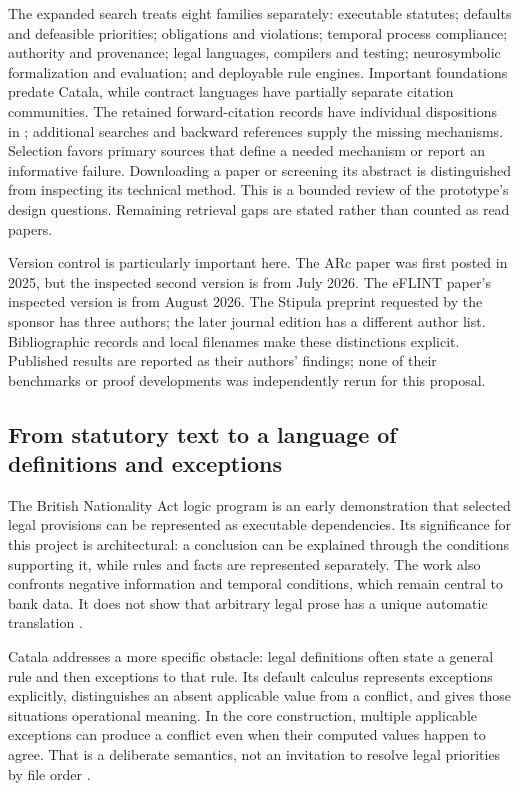 The expanded search treats eight families separately: executable statutes;
defaults and defeasible priorities; obligations and violations; temporal process
compliance; authority and provenance; legal languages, compilers and testing;
neurosymbolic formalization and evaluation; and deployable rule engines. Important
foundations predate Catala, while contract languages have partially separate
citation communities. The retained forward-citation records have individual
dispositions in ; additional searches and backward
references supply the missing mechanisms. Selection favors primary sources that
define a needed mechanism or report an informative failure. Downloading a paper
or screening its abstract is distinguished from inspecting its technical method.
This is a bounded review of the prototype's design questions. Remaining retrieval
gaps are stated rather than counted as read papers.

Version control is particularly important here. The ARc paper was first posted
in 2025, but the inspected second version is from July 2026. The eFLINT paper's
inspected version is from August 2026. The Stipula preprint requested by the
sponsor has three authors; the later journal edition has a different author list.
Bibliographic records and local filenames make these distinctions explicit.
Published results are reported as their authors' findings; none of their
benchmarks or proof developments was independently rerun for this proposal.

\subsection{From statutory text to a language of definitions and exceptions}

The British Nationality Act logic program is an early demonstration that selected
legal provisions can be represented as executable dependencies. Its significance
for this project is architectural: a conclusion can be explained through the
conditions supporting it, while rules and facts are represented separately.
The work also confronts negative information and temporal conditions, which
remain central to bank data. It does not show that arbitrary legal prose has a
unique automatic translation \citep{sergot1986}.

Catala addresses a more specific obstacle: legal definitions often state a
general rule and then exceptions to that rule. Its default calculus represents
exceptions explicitly, distinguishes an absent applicable value from a conflict,
and gives those situations operational meaning. In the core construction,
multiple applicable exceptions can produce a conflict even when their computed
values happen to agree. That is a deliberate semantics, not an invitation to
resolve legal priorities by file order \citep[secs.~3--4]{catala2021}.

